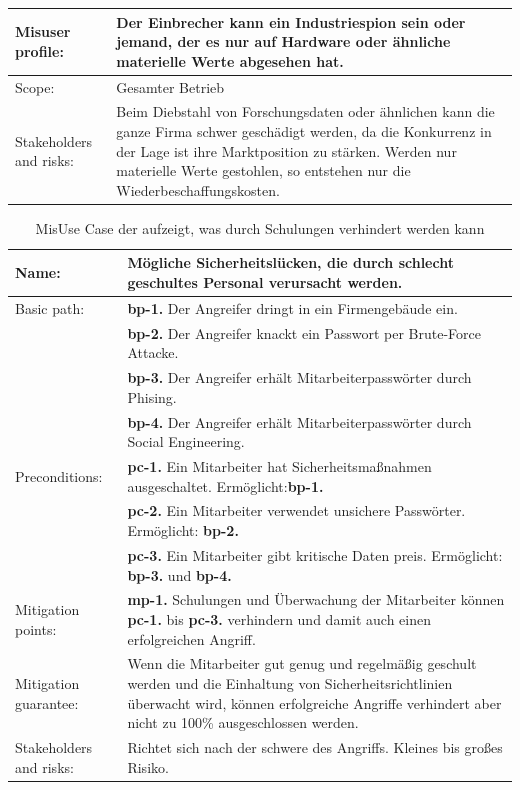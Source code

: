 \begin{table}
\begin{tabular}{p{}p{}}
\hline 
Misuser profile: & Der Einbrecher kann ein Industriespion sein oder jemand, der es nur auf Hardware oder ähnliche materielle Werte abgesehen hat. \\ 
\hline 
Scope: & Gesamter Betrieb \\
\hline 
Stakeholders and risks: &  Beim Diebstahl von Forschungsdaten oder ähnlichen kann die ganze Firma schwer geschädigt werden, da die Konkurrenz in der Lage ist ihre Marktposition zu stärken.
Werden nur materielle Werte gestohlen, so entstehen nur die Wiederbeschaffungskosten. \\ 
\hline
\end{tabular} 
\end{table}

\begin{table}
\scriptsize
\centering
\caption{MisUse Case der aufzeigt, was durch Schulungen verhindert werden kann}
\label{tab:MisuseCaseSchulung}
\begin{tabular}{p{}p{}}
\hline 
Name: & Mögliche Sicherheitslücken, die durch schlecht geschultes Personal verursacht werden. \\ 
\hline 
Basic path: & \textbf{bp-1.} Der Angreifer dringt in ein Firmengebäude ein.\\ 
& \textbf{bp-2.} Der Angreifer knackt ein Passwort per Brute-Force Attacke.\\ 
& \textbf{bp-3.} Der Angreifer erhält Mitarbeiterpasswörter durch Phising.\\ 
& \textbf{bp-4.} Der Angreifer erhält Mitarbeiterpasswörter durch Social Engineering.\\ 
\hline 
Preconditions: & \textbf{pc-1.} Ein Mitarbeiter hat Sicherheitsmaßnahmen ausgeschaltet. Ermöglicht:\textbf{bp-1.} \\
& \textbf{pc-2.} Ein Mitarbeiter verwendet unsichere Passwörter. Ermöglicht: \textbf{bp-2.}\\
& \textbf{pc-3.} Ein Mitarbeiter gibt kritische Daten preis. Ermöglicht: \textbf{bp-3.} und \textbf{bp-4.}\\
\hline 
Mitigation points: & \textbf{mp-1.} Schulungen und Überwachung der Mitarbeiter können \textbf{pc-1.} bis \textbf{pc-3.} verhindern und damit auch einen erfolgreichen Angriff.\\ 
\hline 
Mitigation guarantee: & Wenn die Mitarbeiter gut genug und regelmäßig geschult werden und die Einhaltung von Sicherheitsrichtlinien überwacht wird, können erfolgreiche Angriffe verhindert aber nicht zu 100\% ausgeschlossen werden. \\ 
\hline 
Stakeholders and risks: & Richtet sich nach der schwere des Angriffs. Kleines bis großes Risiko.  \\
\hline 
\end{tabular} 
\end{table}